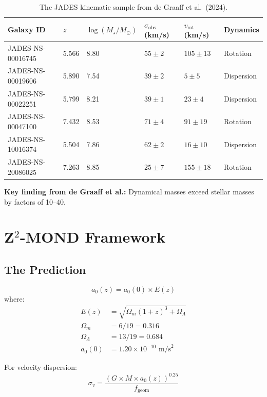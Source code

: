 \documentclass[12pt,a4paper]{article}
\begin{document}
\begin{table}[h]
\centering
\small
\begin{tabular}{@{}llllll@{}}
\toprule
Galaxy ID & $z$ & $\log(M_\star/M_\odot)$ & $\sigma_{\text{obs}}$ (km/s) & $v_{\text{rot}}$ (km/s) & Dynamics \\
\midrule
JADES-NS-00016745 & 5.566 & 8.80 & $55 \pm 2$ & $105 \pm 13$ & Rotation \\
JADES-NS-00019606 & 5.890 & 7.54 & $39 \pm 2$ & $5 \pm 5$ & Dispersion \\
JADES-NS-00022251 & 5.799 & 8.21 & $39 \pm 1$ & $23 \pm 4$ & Dispersion \\
JADES-NS-00047100 & 7.432 & 8.53 & $71 \pm 4$ & $91 \pm 19$ & Rotation \\
JADES-NS-10016374 & 5.504 & 7.86 & $62 \pm 2$ & $16 \pm 10$ & Dispersion \\
JADES-NS-20086025 & 7.263 & 8.85 & $25 \pm 7$ & $155 \pm 18$ & Rotation \\
\bottomrule
\end{tabular}
\caption{The JADES kinematic sample from de Graaff et al.\ (2024).}
\end{table}

\textbf{Key finding from de Graaff et al.:} Dynamical masses exceed stellar masses by factors of 10--40.

\section{Z$^2$-MOND Framework}

\subsection{The Prediction}

\begin{equation}
a_0(z) = a_0(0) \times E(z)
\end{equation}
where:
\begin{align}
E(z) &= \sqrt{\Omega_m(1+z)^3 + \Omega_\Lambda} \\
\Omega_m &= 6/19 = 0.316 \\
\Omega_\Lambda &= 13/19 = 0.684 \\
a_0(0) &= 1.20 \times 10^{-10} \text{ m/s}^2
\end{align}

For velocity dispersion:
\begin{equation}
\sigma_v = \frac{(G \times M \times a_0(z))^{0.25}}{f_{\text{geom}}}
\end{equation}
\end{document}
